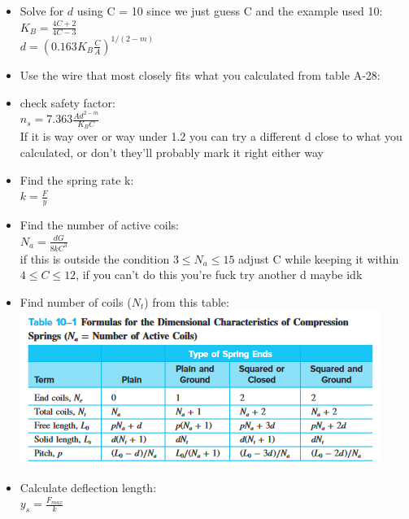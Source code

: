 \documentclass[11pt, fleqn]{article}
\begin{document}
\begin{itemize}
    \item Solve for $d$ using C = 10 since we just guess C and the example used 10:\\
    $K_B = \frac{4C+2}{4C-3}$\\
    $d = (0.163K_B\frac{C}{A})^{1/(2-m)}$\\

    \item Use the wire that most closely fits what you calculated from table A-28:\\

    \item check safety factor:\\
    $n_s = 7.363\frac{Ad^{2-m}}{K_BC}$\\
    If it is way over or way under 1.2 you can try a different d close to what you calculated, or don't they'll probably mark it right either way\\

    \item Find the spring rate k:\\
    $k = \frac{F}{y}$\\

    \item Find the number of active coils:\\
    $N_a = \frac{dG}{8kC^3}$\\
    if this is outside the condition $3 \leq N_a \leq 15$ adjust C while keeping it within $4\leq C \leq 12$, if you can't do this you're fuck try another d maybe idk\\

    \item Find number of coils ($N_t$) from this table:\\
    \includegraphics{Springs/Tab10-1.png}\\

    \item Calculate deflection length:\\
    $y_s = \frac{F_{max}}{k}$\\


\end{itemize}
\end{document}
